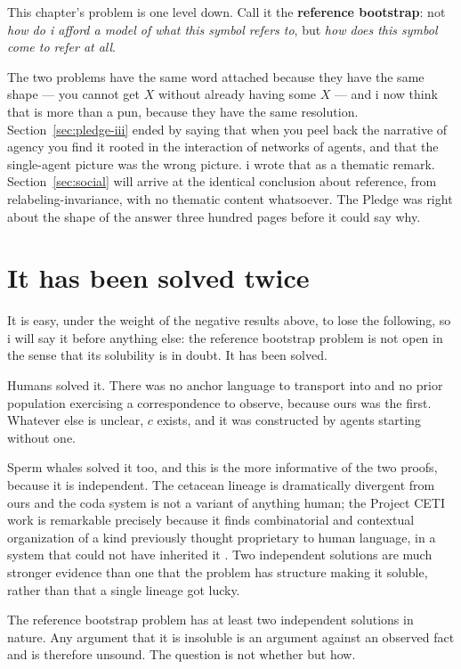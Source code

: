 This chapter's problem is one level down.
Call it the \textbf{reference bootstrap}: not \emph{how do i afford
a model of what this symbol refers to}, but \emph{how does this
symbol come to refer at all}.

The two problems have the same word attached because they have the
same shape --- you cannot get $X$ without already having some $X$
--- and i now think that is more than a pun, because they have the
same resolution.
Section~\ref{sec:pledge-iii} ended by saying that when you peel
back the narrative of agency you find it rooted in the interaction
of networks of agents, and that the single-agent picture was the
wrong picture.
i wrote that as a thematic remark.
Section~\ref{sec:social} will arrive at the identical conclusion
about reference, from relabeling-invariance, with no thematic
content whatsoever.
The Pledge was right about the shape of the answer three hundred
pages before it could say why.

\section{It has been solved twice}
\label{sec:soluble}

It is easy, under the weight of the negative results above, to lose
the following, so i will say it before anything else:
the reference bootstrap problem is not open in the sense that its
solubility is in doubt.
It has been solved.

Humans solved it.
There was no anchor language to transport into and no prior
population exercising a correspondence to observe, because ours was
the first.
Whatever else is unclear, $c$ exists, and it was constructed by
agents starting without one.

Sperm whales solved it too, and this is the more informative of the
two proofs, because it is independent.
The cetacean lineage is dramatically divergent from ours and the
coda system is not a variant of anything human; the Project CETI
work is remarkable precisely because it finds combinatorial and
contextual organization of a kind previously thought proprietary to
human language, in a system that could not have inherited it
\cite{sharma2024,begus2026}.
Two independent solutions are much stronger evidence than one that
the problem has structure making it soluble, rather than that a
single lineage got lucky.

\begin{observation}[Existence]
\label{obs:soluble}
The reference bootstrap problem has at least two independent
solutions in nature.
Any argument that it is insoluble is an argument against an
observed fact and is therefore unsound.
The question is not whether but how.
\end{observation}


